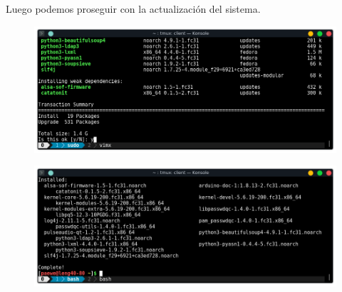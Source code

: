 \documentclass{article}
\begin{document}
Luego podemos proseguir con la actualización del sistema.

\begin{figure}[h!]
  \centering
  \includegraphics[scale=0.75]{./Pictures/005_update_ok.png}
\end{figure}

\begin{figure}[h!]
  \centering
  \includegraphics[scale=0.75]{./Pictures/006_update_ok.png}
\end{figure}
\end{document}
